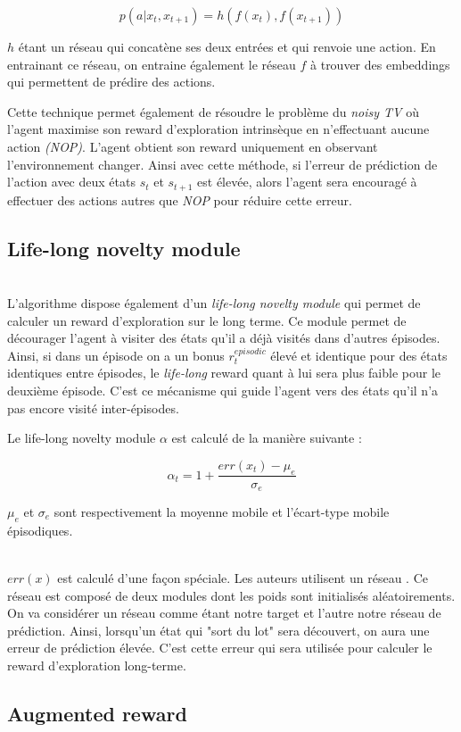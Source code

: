 $$ p(a | x_t, x_{t+1}) = h(f(x_t), f(x_{t+1})) $$

$h$ étant un réseau qui concatène ses deux entrées et qui renvoie une action. En entrainant ce réseau, on entraine également le réseau $f$ à trouver des embeddings qui permettent de prédire des actions.

Cette technique permet également de résoudre le problème du \textit{noisy TV} où l'agent maximise son reward d'exploration intrinsèque en n'effectuant aucune action \textit{(NOP)}. L'agent obtient son reward uniquement en observant l'environnement changer. Ainsi avec cette méthode, si l'erreur de prédiction de l'action avec deux états $s_t$ et $s_{t+1}$ est élevée, alors l'agent sera encouragé à effectuer des actions autres que \textit{NOP} pour réduire cette erreur.

\subsection{Life-long novelty module}

~\\
L'algorithme dispose également d'un \textit{life-long novelty module} qui permet de calculer un reward d'exploration sur le long terme. Ce module permet de décourager l'agent à visiter des états qu'il a déjà visités dans d'autres épisodes. Ainsi, si dans un épisode on a un bonus $r^{episodic}_t$ élevé et identique pour des états identiques entre épisodes, le \textit{life-long} reward quant à lui sera plus faible pour le deuxième épisode. C'est ce mécanisme qui guide l'agent vers des états qu'il n'a pas encore visité inter-épisodes.

Le life-long novelty module $\alpha$ est calculé de la manière suivante :

$$ \alpha_t = 1 + \frac{err(x_t)-\mu_e}{\sigma_e} $$

$\mu_e$ et $\sigma_e$ sont respectivement la moyenne mobile et l'écart-type mobile épisodiques.

~\\
$err(x)$ est calculé d'une façon spéciale. Les auteurs utilisent un réseau . Ce réseau est composé de deux modules dont les poids sont initialisés aléatoirements. On va considérer un réseau comme étant notre target et l'autre notre réseau de prédiction. Ainsi, lorsqu'un état qui "sort du lot" sera découvert, on aura une erreur de prédiction élevée. C'est cette erreur qui sera utilisée pour calculer le reward d'exploration long-terme.

\subsection{Augmented reward}

